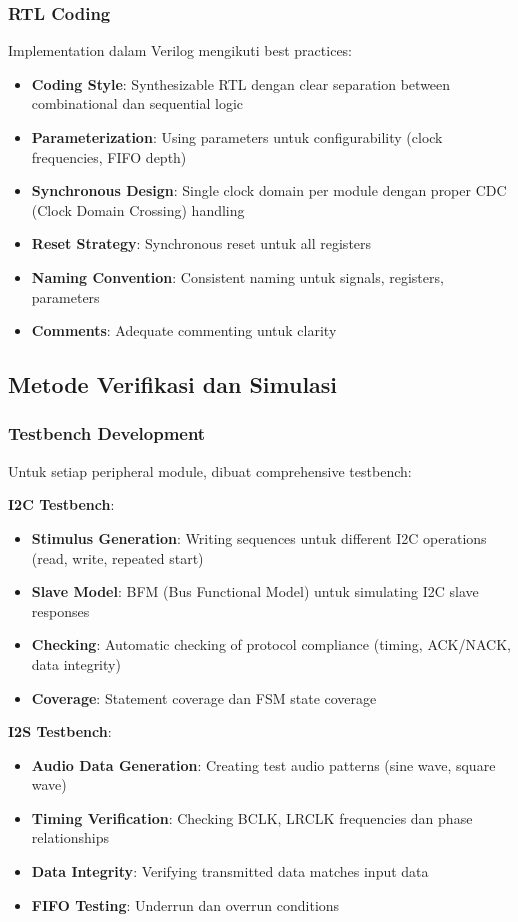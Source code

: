 \subsubsection{RTL Coding}

Implementation dalam Verilog mengikuti best practices:
\begin{itemize}
	\item \textbf{Coding Style}: Synthesizable RTL dengan clear separation between combinational dan sequential logic
	\item \textbf{Parameterization}: Using parameters untuk configurability (clock frequencies, FIFO depth)
	\item \textbf{Synchronous Design}: Single clock domain per module dengan proper CDC (Clock Domain Crossing) handling
	\item \textbf{Reset Strategy}: Synchronous reset untuk all registers
	\item \textbf{Naming Convention}: Consistent naming untuk signals, registers, parameters
	\item \textbf{Comments}: Adequate commenting untuk clarity
\end{itemize}

\subsection{Metode Verifikasi dan Simulasi}

\subsubsection{Testbench Development}

Untuk setiap peripheral module, dibuat comprehensive testbench:

\textbf{I2C Testbench}:
\begin{itemize}
	\item \textbf{Stimulus Generation}: Writing sequences untuk different I2C operations (read, write, repeated start)
	\item \textbf{Slave Model}: BFM (Bus Functional Model) untuk simulating I2C slave responses
	\item \textbf{Checking}: Automatic checking of protocol compliance (timing, ACK/NACK, data integrity)
	\item \textbf{Coverage}: Statement coverage dan FSM state coverage
\end{itemize}

\textbf{I2S Testbench}:
\begin{itemize}
	\item \textbf{Audio Data Generation}: Creating test audio patterns (sine wave, square wave)
	\item \textbf{Timing Verification}: Checking BCLK, LRCLK frequencies dan phase relationships
	\item \textbf{Data Integrity}: Verifying transmitted data matches input data
	\item \textbf{FIFO Testing}: Underrun dan overrun conditions
\end{itemize}

